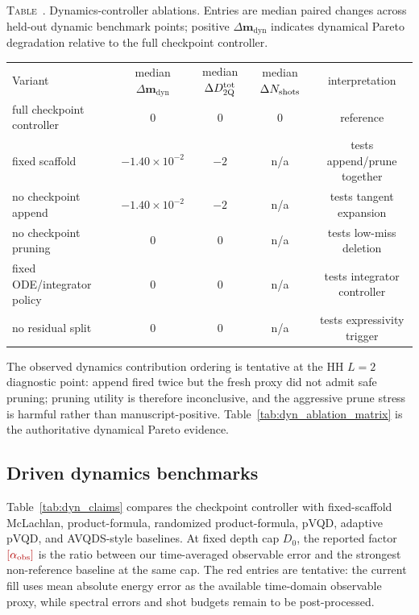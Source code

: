 \documentclass[
  reprint,
  amsmath,
  amssymb,
  aps,
  pra,
  nofootinbib,
  superscriptaddress,
  floatfix
]{revtex4-2}
\newcommand{\placeholder}[1]{\textcolor{red!70!black}{\ifmmode\left[#1\right]\else\textsf{[#1]}\fi}}
\newcommand{\tentative}[1]{\textcolor{red!70!black}{#1}}
\newcommand{\dyn}{\mathrm{dyn}}
\newcommand{\obs}{\mathrm{obs}}
\newcommand{\twq}{\mathrm{2Q}}
\newcommand{\inlinetablecaption}[2]{%
  \refstepcounter{table}\label{#1}%
  \noindent\textsc{Table~\thetable.} #2\par\vspace{0.6ex}%
}
\begin{document}
\begin{widetext}
\inlinetablecaption{tab:dyn_ablation_matrix}{Dynamics-controller ablations. Entries are median paired changes across held-out dynamic benchmark points; positive $\Delta\mathbf m_{\dyn}$ indicates dynamical Pareto degradation relative to the full checkpoint controller.}
\begin{center}
\begin{ruledtabular}
\begin{tabular}{lcccc}
Variant & median $\Delta\mathbf m_{\dyn}$ & median $\Delta D_{\twq}^{\rm tot}$ & median $\Delta N_{\rm shots}$ & interpretation \\
\colrule
full checkpoint controller & 0 & 0 & 0 & reference \\
fixed scaffold & \tentative{$-1.40\!\times\!10^{-2}$} & \tentative{$-2$} & \tentative{n/a} & tests append/prune together \\
no checkpoint append & \tentative{$-1.40\!\times\!10^{-2}$} & \tentative{$-2$} & \tentative{n/a} & tests tangent expansion \\
no checkpoint pruning & \tentative{$0$} & \tentative{$0$} & \tentative{n/a} & tests low-miss deletion \\
fixed ODE/integrator policy & \tentative{$0$} & \tentative{$0$} & \tentative{n/a} & tests integrator controller \\
no residual split & \tentative{$0$} & \tentative{$0$} & \tentative{n/a} & tests expressivity trigger \\
\end{tabular}
\end{ruledtabular}
\end{center}
\end{widetext}

The observed dynamics contribution ordering is \tentative{tentative at the HH $L=2$ diagnostic point: append fired twice but the fresh proxy did not admit safe pruning; pruning utility is therefore inconclusive, and the aggressive prune stress is harmful rather than manuscript-positive}. Table~\ref{tab:dyn_ablation_matrix} is the authoritative dynamical Pareto evidence.

\subsection{Driven dynamics benchmarks}

Table~\ref{tab:dyn_claims} compares the checkpoint controller with fixed-scaffold McLachlan, product-formula, randomized product-formula, pVQD, adaptive pVQD, and AVQDS-style baselines. At fixed depth cap $D_0$, the reported factor $\placeholder{\alpha_{\obs}}$ is the ratio between our time-averaged observable error and the strongest non-reference baseline at the same cap. \tentative{The red entries are tentative: the current fill uses mean absolute energy error as the available time-domain observable proxy, while spectral errors and shot budgets remain to be post-processed.}
\end{document}
